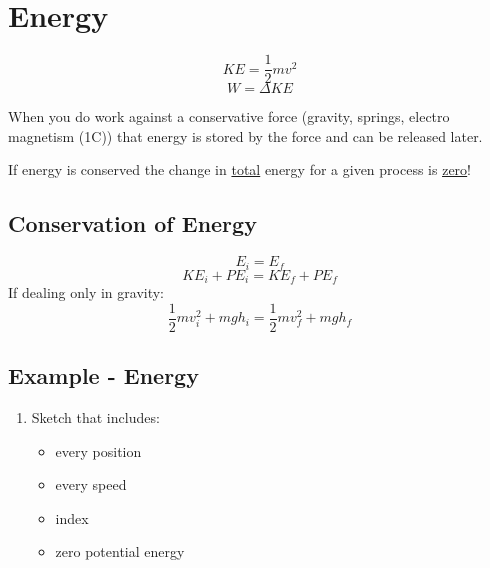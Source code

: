 \documentclass{article}
\begin{document}
\newcommand{\hr}{\par\noindent\rule{\textwidth}{0.4pt}}

\newcommand{\bc}[1]{
	\begin{equation*}
		\begin{boxed}
			{#1}
		\end{boxed}
	\end{equation*}
}

\newcommand{\cond}[2]{
	\ifmmode
		{#1} \quad {#2}
	\else
		$$ {#1} \quad {#2} $$
	\fi
}

\tableofcontents

\section{Energy}

\begin{equation}
	KE = \frac{1}{2}mv^2
\end{equation}
\begin{equation}
	W = \Delta KE
\end{equation}

When you do work against a conservative force (gravity, springs, electro magnetism (1C)) that energy is stored by the force and can be released later.

If energy is conserved the change in \underline{total} energy for a given process is \underline{\underline{zero}}!

\subsection{Conservation of Energy}

\begin{equation}
	E_i = E_f
\end{equation}
\begin{equation}
	KE_i + PE_i = KE_f + PE_f
\end{equation}
If dealing only in gravity:
\begin{equation}
	\frac{1}{2}mv_i^2 + mgh_i = \frac{1}{2}mv_f^2 + mgh_f
\end{equation}

\subsection{Example - Energy}

\begin{enumerate}[label=\textbf{Step \arabic*:}]
	\item
		Sketch that includes:
		\begin{itemize}
			\item every position
			\item every speed
			\item index
			\item zero potential energy
		\end{itemize}
\end{enumerate}
\end{document}
